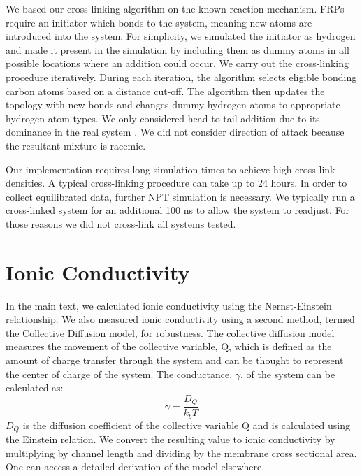\documentclass{article}
\begin{document}
  We based our cross-linking algorithm on the known reaction mechanism.
  FRPs require an initiator which bonds to the system, meaning new atoms are
  introduced into the system. For simplicity, we simulated the initiator as
  hydrogen and made it present in the simulation by including them as dummy atoms
  in all possible locations where an addition could occur. We carry out the
  cross-linking procedure iteratively. During each iteration, the algorithm
  selects eligible bonding carbon atoms based on a distance cut-off. The algorithm
  then updates the topology with new bonds and changes dummy hydrogen atoms to appropriate
  hydrogen atom types. We only considered head-to-tail addition
  due to its dominance in the real system \cite{young_introduction_2011}. We did
  not consider direction of attack because the resultant mixture is racemic.

  Our implementation requires long simulation times to achieve high cross-link 
  densities. A typical cross-linking procedure can take up to 24 hours. In
  order to collect equilibrated data, further NPT simulation is necessary. We
  typically run a cross-linked system for an additional 100 ns to allow the system
  to readjust. For those reasons we did not cross-link all systems tested.
  
  \clearpage
  
  \section{Ionic Conductivity}\label{section:ionic_conductivity}
  
  In the main text, we calculated ionic conductivity using the Nernst-Einstein 
  relationship. We also measured ionic conductivity using a second method, 
  termed the Collective Diffusion model, for robustness. The collective 
  diffusion model measures the movement of the collective variable, Q, which
  is defined as the amount of charge transfer through the system and can be 
  thought to represent the center of charge of the system. The conductance, 
  $\gamma$, of the system can be calculated as:
  \begin{equation}
	 \gamma = \dfrac{D_Q}{k_b T} 
	\label{eqn:collective_diffusion}
  \end{equation}
  $D_Q$ is the diffusion coefficient of the collective variable Q and is 
  calculated using the Einstein relation. We convert the resulting value
  to ionic conductivity by multiplying by channel length and dividing by
  the membrane cross sectional area. One can access a detailed derivation of 
  the model elsewhere\cite{liu_collective_2013}.
  
\end{document}

